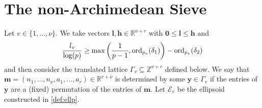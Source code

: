 %
%
%
%


\section{The non-Archimedean Sieve}
\label{sec:nonArchSieve}

Let $v \in \{1, \dots, \nu\}$. We take vectors $\mathbf{l},\mathbf{h} \in \mathbb{R}^{\nu+r}$ with $\mathbf{0} \leq \mathbf{l} \leq \mathbf{h}$ and 
\[\frac{l_v}{\log(p)} \geq \max\left( \frac{1}{p-1}, \operatorname{ord}_{p_v}(\delta_1)\right) - \operatorname{ord}_{p_v}(\delta_2)\]
and then consider the translated lattice $\Gamma_v \subseteq \mathbb{Z}^{\nu + r}$ defined below. We say that ${\mathbf{m} = (n_1, \dots, n_{\nu}, a_1, \dots, a_r) \in \mathbb{R}^{r + \nu}}$ is determined by some $\mathbf{y} \in \Gamma_v$ if the entries of $\mathbf{y}$ are a (fixed) permutation of the entries of $\mathbf{m}$. Let $\mathcal{E}_v$ be the ellipsoid constructed in \eqref{def:ellp}. 

